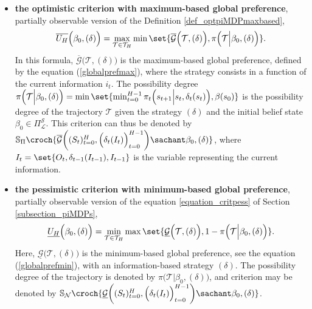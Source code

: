 \begin{itemize}
\item \textbf{the optimistic criterion with maximum-based global preference}, partially observable version of the Definition \ref{def_optpiMDPmaxbased},
\begin{equation}
\label{optmaxpiPOMDPcrit}
\overline{U_H}\Big(\beta_0,(\delta)\Big) = \max_{\mathcal{T} \in \mathcal{T}_H} \min \set{ \overline{\mathcal{G}} \Big(\mathcal{T},(\delta)\Big), \pi \Big( \mathcal{T} \Big\vert \beta_0, (\delta) \Big) }.
\end{equation}
In this formula, $\overline{\mathcal{G}}\Big(\mathcal{T},(\delta)\Big)$
is the maximum-based global preference, defined by the equation (\ref{globalprefmax}),
where the strategy consists in a function of the current information $i_t$.
The possibility degree $\pi \Big( \mathcal{T} \Big\vert \beta_0, (\delta) \Big) = \min \set{ \min_{t=0}^{H-1} \pi_t \Big( s_{t+1} \Big\vert s_t, \delta_t(s_t) \Big), \beta(s_0) }$ 
is the possibility degree of the trajectory $\mathcal{T}$
given the strategy $(\delta)$ and the initial belief state $\beta_0 \in \Pi^{\mathcal{S}}_{\mathcal{L}}$.
This criterion can thus be denoted by $\mathbb{S}_{\Pi} \croch{  \overline{\mathcal{G}} \bigg( (S_t)_{t=0}^{H}, \Big(\delta_t(I_t)\Big)_{t=0}^{H-1} \bigg) \sachant \beta_0, (\delta) }$,
where $I_t = \set{ O_t, \delta_{t-1}(I_{t-1}), I_{t-1}}$ 
is the variable representing the current information.
\item \textbf{the pessimistic criterion with minimum-based global preference}, partially observable version of the equation \ref{equation_critpess} of Section \ref{subsection_piMDPs},
\begin{equation}
\label{pessminpiPOMDPcrit} 
\underline{U_H}\Big(\beta_0,(\delta)\Big) = \min_{\mathcal{T} \in \mathcal{T}_H} \max \set{ \underline{\mathcal{G}} \Big(\mathcal{T},(\delta)\Big), 1 - \pi \Big( \mathcal{T} \Big\vert \beta_0, (\delta) \Big) }.
\end{equation}
Here, $\underline{\mathcal{G}}\Big(\mathcal{T},(\delta)\Big)$
is the minimum-based global preference, see the equation (\ref{globalprefmin}),
with an information-based strategy $(\delta)$.
The possibility degree of the trajectory is denoted by 
$\pi \Big( \mathcal{T} \Big\vert \beta_0, (\delta) \Big)$,
and criterion may be denoted by 
$\mathbb{S}_{\mathcal{N}} \croch{  \underline{\mathcal{G}} \bigg( (S_t)_{t=0}^{H}, \Big(\delta_t(I_t)\Big)_{t=0}^{H-1} \bigg) \sachant \beta_0, (\delta) }$.
\end{itemize}

